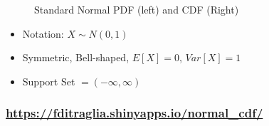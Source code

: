 \documentclass[handout]{beamer}
\begin{document}
\begin{frame}
\begin{figure}[h]
\begin{tabular}{cc}
\end{tabular}
\caption{Standard Normal PDF (left) and CDF (Right)}
\end{figure}
\begin{itemize}
  \item Notation: $X \sim N(0,1)$
  \item Symmetric, Bell-shaped, $E[X]=0$, $Var[X]=1$
  \item Support Set $= (-\infty,\infty)$
\end{itemize}
\end{frame}


\begin{frame}
	\frametitle{\href{https://fditraglia.shinyapps.io/normal_cdf/}{https://fditraglia.shinyapps.io/normal\_cdf/}}

\begin{figure}
\end{figure}

\end{frame}
\end{document}
